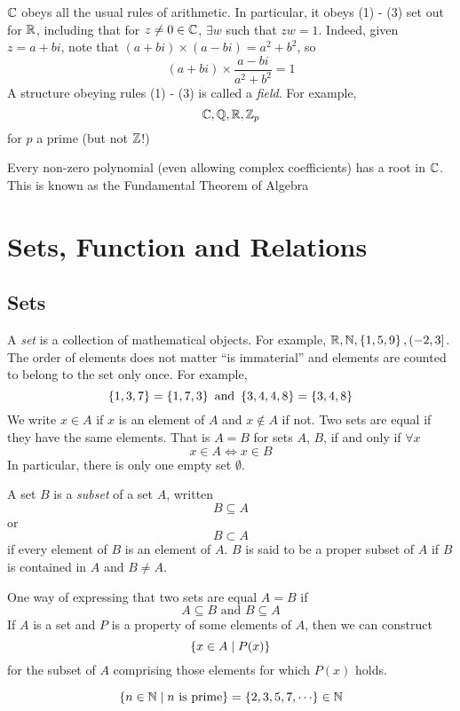 \documentclass{article}
\begin{document}
\begin{remark}\leavevmode
    \item $\mathbb{C}$ obeys all the usual rules of arithmetic. 
    In particular, it obeys (1) - (3) set out for $\mathbb{R}$, including that for $z \neq 0 \in \mathbb{C}$, $\exists w$ such that $zw = 1$.
    Indeed, given $z = a + bi$, note that $(a + bi) \times (a - bi) = a^2 + b^2$, so
    \[
        (a + bi) \times \frac{a - bi}{a^2 + b^2} = 1  
    \]
    A structure obeying rules (1) - (3) is called a \emph{field}. For example,
    \[
        \mathbb{C}, \mathbb{Q}, \mathbb{R}, \mathbb{Z}_p  
    \]
    for $p$ a prime (but not $\mathbb{Z}$!)

    \item Every non-zero polynomial (even allowing complex coefficients) has a root in $\mathbb{C}$.
    This is known as the Fundamental Theorem of Algebra
\end{remark}

\section{Sets, Function and Relations}
\subsection{Sets}
A \emph{set} is a collection of mathematical objects. For example, $\mathbb{R}, \mathbb{N}, \left\{ 1, 5, 9 \right\} , (-2, 3]$.
The order of elements does not matter ``is immaterial'' and elements are counted to belong to the set only once.
For example,
\[
    \left\{ 1, 3, 7 \right\} = \left\{ 1, 7, 3 \right\} \text{ and } \left\{ 3, 4, 4, 8 \right\} = \left\{ 3, 4, 8 \right\}
\]
We write $x \in A$ if $x$ is an element of $A$ and $x \notin A$ if not.
Two sets are equal if they have the same elements. 
That is $A = B$ for sets $A$, $B$, if and only if $\forall x$
\[
    x \in A \Longleftrightarrow x \in B
\]
In particular, there is only one empty set $\emptyset$.

\begin{defi}[Subset]
    A set $B$ is a \emph{subset} of a set $A$, written 
    \[
        B \subseteq A  
    \]
    or 
    \[
        B \subset A \tag{strict inclusion}
    \]
    if every element of $B$ is an element of $A$. 
    $B$ is said to be a proper subset of $A$ if $B$ is contained in $A$ and $B \neq A$.
\end{defi}
One way of expressing that two sets are equal $A = B$ if
\[
    A \subseteq B \text{ and } B \subseteq A
\]
If $A$ is a set and $P$ is a property of some elements of $A$, then we can construct
\[
    \left\{ x \in A \mid P(x) \right\}
\]
for the subset of $A$ comprising those elements for which $P(x)$ holds.
\begin{eg}
    \[
        \crbkt{n \in \N \mid n \text{ is prime}}  = \crbkt{2, 3, 5, 7, \cdots} \in \N
    \]
\end{eg}
\end{document}
